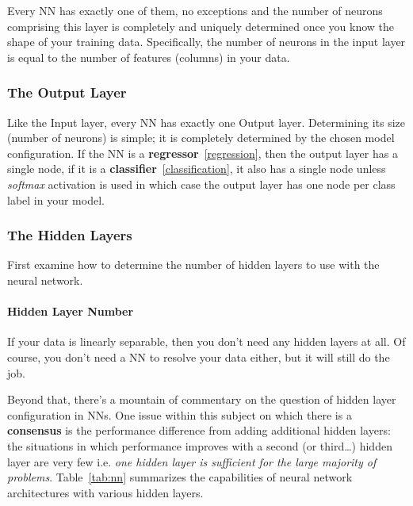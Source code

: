Every NN has exactly one of them, no exceptions and the number of neurons comprising this layer is completely and uniquely determined once you know the shape of your training data. Specifically, the number of neurons in the input layer is equal to the number of features (columns) in your data. 

\subsubsection*{The Output Layer}

Like the Input layer, every NN has exactly one Output layer. Determining its size (number of neurons) is simple; it is completely determined by the chosen model configuration.
If the NN is a \textbf{regressor}~\ref{regression}, then the output layer has a single node, if it is a \textbf{classifier}~\ref{classification}, it also has a single node unless \emph{softmax} activation is used in which case the output layer has one node per class label in your model.

\subsubsection*{The Hidden Layers}

First examine how to determine the number of hidden layers to use with the neural network.

\paragraph{Hidden Layer Number}
If your data is linearly separable, then you don't need any hidden layers at all. Of course, you don't need a NN to resolve your data either, but it will still do the job.

Beyond that, there's a mountain of commentary on the question of hidden layer configuration in NNs. One issue within this subject on which there is a \textbf{consensus} is the performance difference from adding additional hidden layers: the situations in which performance improves with a second (or third\ldots) hidden layer are very few i.e. \emph{one hidden layer is sufficient for the large majority of problems}. Table~\ref{tab:nn} summarizes the capabilities of neural network architectures with various hidden layers.

